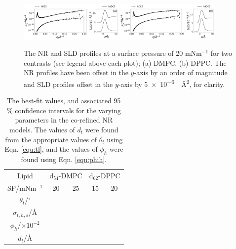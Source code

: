 \documentclass[twocolumn,a4paper]{paper}
\begin{document}
%
\begin{figure}
	\centering
	\includegraphics[width=0.45\textwidth]{figures/dmpc_20n_ref_sld}
	\includegraphics[width=0.45\textwidth]{figures/dppc_20n_ref_sld}
	\caption{\small The NR and SLD profiles at a surface pressure of 20 mNm$^{-1}$ for two contrasts (see legend above each plot); (a) DMPC, (b) DPPC. The NR profiles have been offset in the $y$-axis by an order of magnitude and SLD profiles offset in the $y$-axis by \SI{5e-6}{\per\square\angstrom}, for clarity.}
	\label{fig:neutron}
\end{figure}
%
%
\begin{table}
  \centering
	\caption{\label{tab:neutron} The best-fit values, and associated 95 \% confidence intervals for the varying parameters in the co-refined NR models. The values of $d_t$ were found from the appropriate values of $\theta_t$ using Eqn. \ref{equ:tl}, and the values of $\phi_h$ were found using Eqn. \ref{equ:phih}.}
	\begin{tabular}{ccccc}
    Lipid & \multicolumn{2}{c}{d$_{54}$-DMPC} & \multicolumn{2}{c}{d$_{62}$-DPPC} \\
    SP/mNm$^{-1}$ & 20 & 25 & 15 & 20 \\
		\hline
		$\theta_t$/$^\circ$ &  &  &  &  \\
		$\sigma_{t,h,s}$/\AA &  &  &  &  \\
    \hline
    $\phi_h$/$\times10^{-2}$ &  &  &  &  \\
		$d_t$/\AA &  &  &  &  \\
	\end{tabular}
\end{table}
%
\end{document}
